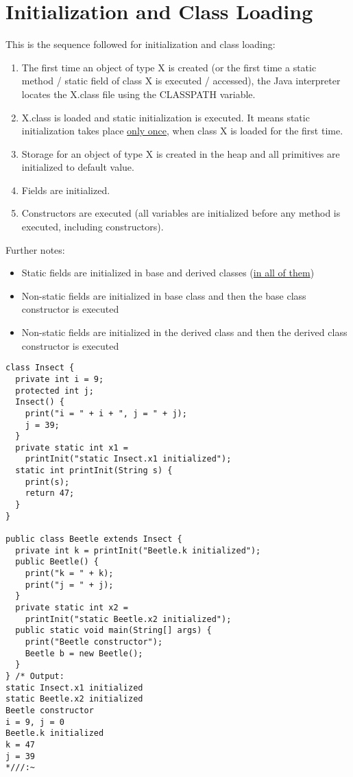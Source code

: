 \documentclass[10pt,letterpaper]{report}
\begin{document}
\section{Initialization and Class Loading}
This is the sequence followed for initialization and class loading:
\begin{enumerate}
\item The first time an object of type X is created (or the first time a static method / static field of class X is executed / accessed), the Java interpreter locates the X.class file using the CLASSPATH variable.
\item X.class is loaded and static initialization is executed. It means static initialization takes place \underline{only once}, when class X is loaded for the first time.
\item Storage for an object of type X is created in the heap and all primitives are initialized to default value.
\item Fields are initialized.
\item Constructors are executed (all variables are initialized before any method is executed, including constructors).
\end{enumerate}
Further notes:
\begin{itemize}
\item Static fields are initialized in base and derived classes (\underline{in all of them})
\item Non-static fields are initialized in base class and then the base class constructor is executed
\item Non-static fields are initialized in the derived class and then the derived class constructor is executed
\end{itemize}
\begin{lstlisting}
class Insect {
  private int i = 9;
  protected int j;
  Insect() {
    print("i = " + i + ", j = " + j);
    j = 39;
  }
  private static int x1 =
    printInit("static Insect.x1 initialized");
  static int printInit(String s) {
    print(s);
    return 47;
  }
}

public class Beetle extends Insect {
  private int k = printInit("Beetle.k initialized");
  public Beetle() {
    print("k = " + k);
    print("j = " + j);
  }
  private static int x2 =
    printInit("static Beetle.x2 initialized");
  public static void main(String[] args) {
    print("Beetle constructor");
    Beetle b = new Beetle();
  }
} /* Output:
static Insect.x1 initialized
static Beetle.x2 initialized
Beetle constructor
i = 9, j = 0
Beetle.k initialized
k = 47
j = 39
*///:~
\end{lstlisting}
\end{document}
